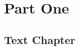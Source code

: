 \documentclass[11pt,fleqn]{book} %
\begin{document}


\pagestyle{empty} %

\tableofcontents %



\pagestyle{fancy} %


\part{Part One}



\chapter{Text Chapter}
\end{document}
